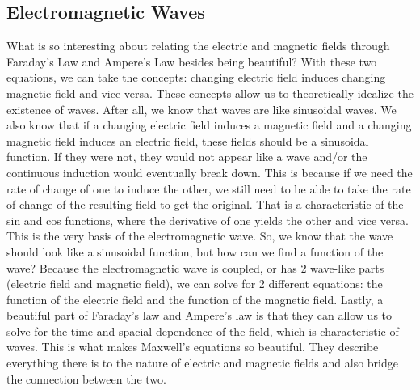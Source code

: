 \documentclass{article}
\begin{document}
\subsection{Electromagnetic Waves}
What is so interesting about relating the electric and magnetic fields through Faraday's Law and Ampere's Law besides being beautiful? With these two equations, we can take the concepts: changing electric field induces changing magnetic field and vice versa. These concepts allow us to theoretically idealize the existence of waves. After all, we know that waves are like sinusoidal waves. We also know that if a changing electric field induces a magnetic field and a changing magnetic field induces an electric field, these fields should be a sinusoidal function. If they were not, they would not appear like a wave and/or the continuous induction would eventually break down. This is because if we need the rate of change of one to induce the other, we still need to be able to take the rate of change of the resulting field to get the original. That is a characteristic of the sin and cos functions, where the derivative of one yields the other and vice versa. This is the very basis of the electromagnetic wave. So, we know that the wave should look like a sinusoidal function, but how can we find a function of the wave? Because the electromagnetic wave is coupled, or has 2 wave-like parts (electric field and magnetic field), we can solve for 2 different equations: the function of the electric field and the function of the magnetic field. Lastly, a beautiful part of Faraday's law and Ampere's law is that they can allow us to solve for the time and spacial dependence of the field, which is characteristic of waves. This is what makes Maxwell's equations so beautiful. They describe everything there is to the nature of electric and magnetic fields and also bridge the connection between the two. 
\end{document}
